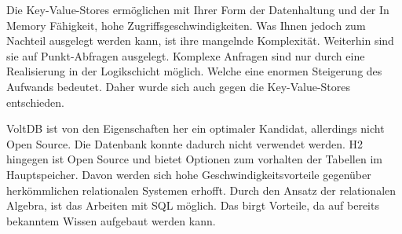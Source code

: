 Die Key-Value-Stores ermöglichen mit Ihrer Form der Datenhaltung und der In Memory Fähigkeit, hohe Zugriffsgeschwindigkeiten. Was Ihnen jedoch zum Nachteil ausgelegt werden kann, ist ihre mangelnde Komplexität. Weiterhin sind sie auf Punkt-Abfragen ausgelegt. Komplexe Anfragen sind nur durch eine Realisierung in der Logikschicht möglich. Welche eine enormen Steigerung des Aufwands bedeutet. Daher wurde sich auch gegen die Key-Value-Stores entschieden. 

VoltDB ist von den Eigenschaften her ein optimaler Kandidat, allerdings nicht Open Source. Die Datenbank konnte dadurch nicht verwendet werden. H2 hingegen ist Open Source und bietet Optionen zum vorhalten der Tabellen im Hauptspeicher. Davon werden sich hohe Geschwindigkeitsvorteile gegenüber herkömmlichen relationalen Systemen erhofft. Durch den Ansatz der relationalen Algebra, ist das Arbeiten mit SQL möglich. Das birgt Vorteile, da auf bereits bekanntem Wissen aufgebaut werden kann.